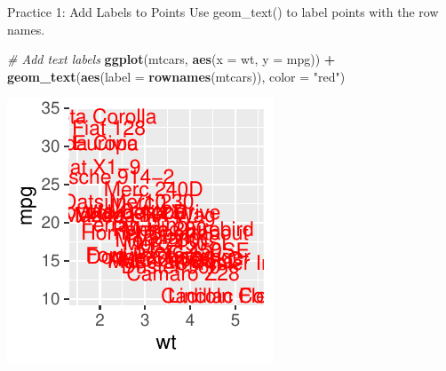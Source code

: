 \documentclass[
  ignorenonframetext,
]{beamer}
\newenvironment{Shaded}{\begin{snugshade}}{\end{snugshade}}
\newcommand{\AttributeTok}[1]{\textcolor[rgb]{0.13,0.29,0.53}{#1}}
\newcommand{\CommentTok}[1]{\textcolor[rgb]{0.56,0.35,0.01}{\textit{#1}}}
\newcommand{\FunctionTok}[1]{\textcolor[rgb]{0.13,0.29,0.53}{\textbf{#1}}}
\newcommand{\NormalTok}[1]{#1}
\newcommand{\SpecialCharTok}[1]{\textcolor[rgb]{0.81,0.36,0.00}{\textbf{#1}}}
\newcommand{\StringTok}[1]{\textcolor[rgb]{0.31,0.60,0.02}{#1}}
\begin{document}
\begin{frame}[fragile]{Practice 1: Add Labels to Points}
\label{practice-1-add-labels-to-points}
Use geom\_text() to label points with the row names.


\begin{Shaded}
\begin{Highlighting}[]
\CommentTok{\# Add text labels}
\FunctionTok{ggplot}\NormalTok{(mtcars, }\FunctionTok{aes}\NormalTok{(}\AttributeTok{x =}\NormalTok{ wt, }\AttributeTok{y =}\NormalTok{ mpg)) }\SpecialCharTok{+} \FunctionTok{geom\_text}\NormalTok{(}\FunctionTok{aes}\NormalTok{(}\AttributeTok{label =} \FunctionTok{rownames}\NormalTok{(mtcars)),}
    \AttributeTok{color =} \StringTok{"red"}\NormalTok{)}
\end{Highlighting}
\end{Shaded}

\begin{center}\includegraphics[width=0.5\linewidth]{Figs/unnamed-chunk-23-1} \end{center}
\end{frame}
\end{document}
